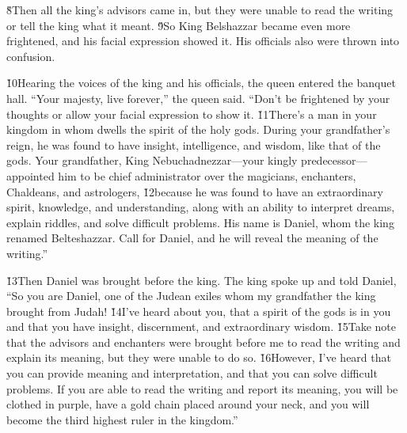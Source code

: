 \v{8}Then all the king's advisors came in, but they were unable to read the writing or tell the king what it meant. \v{9}So King Belshazzar became even more frightened, and his facial expression showed it. His officials also were thrown into confusion.

\v{10}Hearing the voices of the king and his officials, the queen entered the banquet hall. ``Your majesty, live forever,'' the queen said. ``Don't be frightened by your thoughts or allow your facial expression to show it. \v{11}There's a man in your kingdom in whom dwells the spirit of the holy gods. During your grandfather's reign, he was found to have insight, intelligence, and wisdom, like that of the gods. Your grandfather, King Nebuchadnezzar---your kingly predecessor---appointed him to be chief administrator over the magicians, enchanters, Chaldeans, and astrologers, \v{12}because he was found to have an extraordinary spirit, knowledge, and understanding, along with an ability to interpret dreams, explain riddles, and solve difficult problems. His name is Daniel, whom the king renamed Belteshazzar. Call for Daniel, and he will reveal the meaning of the writing.''

\v{13}Then Daniel was brought before the king. The king spoke up and told Daniel, ``So you are Daniel, one of the Judean exiles whom my grandfather the king brought from Judah! \v{14}I've heard about you, that a spirit of the gods is in you and that you have insight, discernment, and extraordinary wisdom. \v{15}Take note that the advisors and enchanters were brought before me to read the writing and explain its meaning, but they were unable to do so. \v{16}However, I've heard that you can provide meaning and interpretation, and that you can solve difficult problems. If you are able to read the writing and report its meaning, you will be clothed in purple, have a gold chain placed around your neck, and you will become the third highest ruler in the kingdom.''

